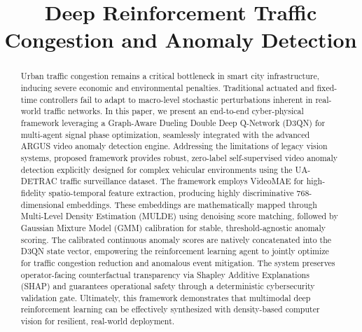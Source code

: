 \documentclass[conference]{IEEEtran}
\makeatletter
\newcommand{\linebreakand}{%
  \end{@IEEEauthorhalign}
  \hfill\mbox{}\par
  \mbox{}\hfill\begin{@IEEEauthorhalign}
}
\makeatother
\begin{document}
\title{Deep Reinforcement Traffic Congestion and Anomaly Detection\\
}
\author{
\and
{}
\and
{}
\and
{}
}

\maketitle

\begin{abstract}
Urban traffic congestion remains a critical bottleneck in smart city infrastructure, inducing severe economic and environmental penalties. Traditional actuated and fixed-time controllers fail to adapt to macro-level stochastic perturbations inherent in real-world traffic networks. In this paper, we present an end-to-end cyber-physical framework leveraging a Graph-Aware Dueling Double Deep Q-Network (D3QN) for multi-agent signal phase optimization, seamlessly integrated with the advanced ARGUS video anomaly detection engine. Addressing the limitations of legacy vision systems, proposed framework provides robust, zero-label self-supervised video anomaly detection explicitly designed for complex vehicular environments using the UA-DETRAC traffic surveillance dataset. The framework employs VideoMAE for high-fidelity spatio-temporal feature extraction, producing highly discriminative 768-dimensional embeddings. These embeddings are mathematically mapped through Multi-Level Density Estimation (MULDE) using denoising score matching, followed by Gaussian Mixture Model (GMM) calibration for stable, threshold-agnostic anomaly scoring. The calibrated continuous anomaly scores are natively concatenated into the D3QN state vector, empowering the reinforcement learning agent to jointly optimize for traffic congestion reduction and anomalous event mitigation. The system preserves operator-facing counterfactual transparency via Shapley Additive Explanations (SHAP) and guarantees operational safety through a deterministic cybersecurity validation gate. Ultimately, this framework demonstrates that multimodal deep reinforcement learning can be effectively synthesized with density-based computer vision for resilient, real-world deployment.
\end{abstract}
\end{document}
